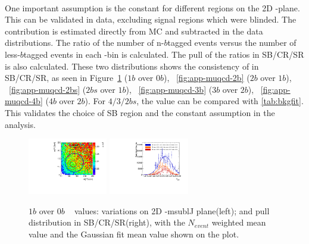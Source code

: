 \paragraph{}
One important assumption is the constant \muqcd for different regions on the 2D \mleadJ-\msublJ plane. 
This can be validated in data, excluding signal regions which were blinded. 
The \ttbar~ contribution is estimated directly from MC and subtracted in the data distributions. 
The ratio of the number of n-$b$tagged events versus the number of less-$b$tagged events in each \mleadJ-\msublJ bin is calculated.
The pull of the ratios in SB/CR/SR is also calculated.
These two distributions shows the consistency of \muqcd in SB/CR/SR, as seen in Figure~\ref{fig:app-muqcd-1b} ($1b$ over $0b$), ~\ref{fig:app-muqcd-2b} ($2b$ over $1b$), ~\ref{fig:app-muqcd-2bs} ($2bs$ over $1b$), ~\ref{fig:app-muqcd-3b} ($3b$ over $2b$), ~\ref{fig:app-muqcd-4b} ($4b$ over $2b$). For $4/3/2bs$, the \muqcd value can be compared with \ref{tab:bkgfit}. 
This validates the choice of SB region and the constant \muqcd assumption in the analysis.

\begin{figure}[htbp!]
\begin{center}
\includegraphics[width=0.31\textwidth,angle=-90]{figures/boosted/AppendixMuqcdstudy/OneTag_Incl_mH0H1.pdf}
\includegraphics[width=0.31\textwidth,angle=-90]{figures/boosted/AppendixMuqcdstudy/OneTag_Incl_mH0H1_pull.pdf}
\caption{$1b$ over 0$b$ \muqcd~ values: \muqcd variations on 2D \mleadJ-msublJ plane(left); and \muqcd pull distribution in SB/CR/SR(right), with the $N_{event}$ weighted mean value and the Gaussian fit mean value shown on the plot.}
\label{fig:app-muqcd-1b}
\end{center}
\end{figure}

